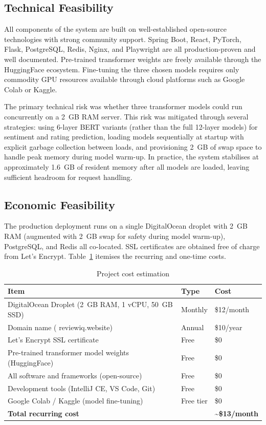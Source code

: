 \documentclass[12pt,a4paper,oneside]{report}
\renewcommand{\texttt}[1]{%
  {\ttfamily\hyphenchar\font=45\relax #1}}
\begin{document}
\subsection{Technical Feasibility}
All components of the system are built on well-established open-source
technologies with strong community support. Spring Boot, React, PyTorch,
Flask, PostgreSQL, Redis, Nginx, and Playwright are all production-proven
and well documented. Pre-trained transformer weights are freely
available through the HuggingFace ecosystem. Fine-tuning the three
chosen models requires only commodity GPU resources available through
cloud platforms such as Google Colab or Kaggle.

The primary technical risk was whether three transformer models could run
concurrently on a 2~GB RAM server. This risk was mitigated through
several strategies: using 6-layer BERT variants (rather than the full
12-layer models) for sentiment and rating prediction, loading models
sequentially at startup with explicit garbage collection between loads,
and provisioning 2~GB of swap space to handle peak memory during model
warm-up. In practice, the system stabilises at approximately 1.6~GB of
resident memory after all models are loaded, leaving sufficient headroom
for request handling.

\subsection{Economic Feasibility}
The production deployment runs on a single DigitalOcean droplet with
2~GB RAM (augmented with 2~GB swap for safety during model warm-up),
PostgreSQL, and Redis all co-located. SSL certificates are obtained
free of charge from Let's Encrypt. Table~\ref{tab:cost} itemises the
recurring and one-time costs.

\begin{table}[ht]
\centering
\caption{Project cost estimation}
\label{tab:cost}
\begin{tabularx}{\textwidth}{X l l}
\toprule
\textbf{Item} & \textbf{Type} & \textbf{Cost} \\
\midrule
DigitalOcean Droplet (2~GB RAM, 1 vCPU, 50~GB SSD) & Monthly & \$12/month \\
Domain name (\texttt{reviewiq.website})              & Annual  & \$10/year \\
Let's Encrypt SSL certificate                        & Free    & \$0 \\
Pre-trained transformer model weights (HuggingFace)  & Free    & \$0 \\
All software and frameworks (open-source)            & Free    & \$0 \\
Development tools (IntelliJ CE, VS Code, Git)        & Free    & \$0 \\
Google Colab / Kaggle (model fine-tuning)            & Free tier & \$0 \\
\midrule
\textbf{Total recurring cost}                        &         & \textbf{\textasciitilde\$13/month} \\
\bottomrule
\end{tabularx}
\end{table}
\end{document}
